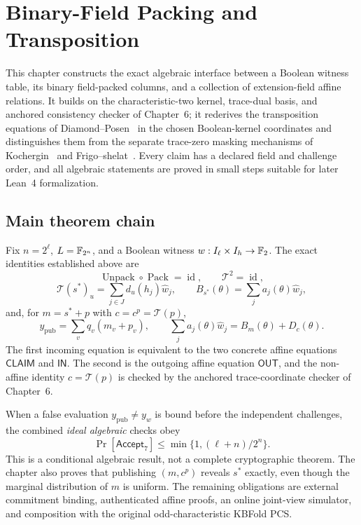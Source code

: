 \section{Binary-Field Packing and Transposition}\label{sec:packing}

This chapter constructs the exact algebraic interface
between a Boolean witness table, its binary field-packed
columns, and a collection of extension-field affine
relations. It builds on the characteristic-two kernel,
trace-dual basis, and anchored consistency checker of
Chapter~6; it rederives the transposition equations of
Diamond--Posen~\cite{DiamondPosen2024} in the chosen
Boolean-kernel coordinates and distinguishes them from
the separate trace-zero masking mechanisms of
Kochergin~\cite{Kochergin2026} and
Frigo--shelat~\cite{FrigoShelat2026}.
Every claim has a declared field and challenge order,
and all algebraic statements are proved in small steps
suitable for later Lean~4 formalization.









\subsection{Main theorem chain}\label{sec:packing:conclusion}

Fix $n=2^\ell$, $L=\mathbb{F}_{2^n}$, and a Boolean
witness $w:I_\ell\times I_h\to\mathbb{F}_2$.
The exact identities established above are
\[
 \boxed{
 \operatorname{Unpack}\circ\operatorname{Pack}
        =\operatorname{id},\qquad
 \mathcal T^2=\operatorname{id},}
\]
\[
 \boxed{
 \mathcal T(s^*)_u
 =\sum_{j\in J}d_u(h_j)\widehat w_j,\qquad
 B_{s^*}(\theta)=\sum_ja_j(\theta)\widehat w_j,}
\]
and, for $m=s^*+p$ with $c=c^p=\mathcal T(p)$,
\[
 \boxed{
 y_{\mathrm{pub}}=\sum_vq_v(m_v+p_v),\qquad
 \sum_ja_j(\theta)\widehat w_j
       =B_m(\theta)+D_c(\theta).}
\]
The first incoming equation is equivalent to
the two concrete affine equations
$\mathsf{CLAIM}$ and $\mathsf{IN}$.
The second is the outgoing affine equation
$\mathsf{OUT}$, and the non-affine identity
$c=\mathcal T(p)$ is checked by the
anchored trace-coordinate checker of Chapter~6.

When a false evaluation $y_{\mathrm{pub}}\neq y_w$
is bound before the independent challenges,
the combined \emph{ideal algebraic} checks obey
\[
 \boxed{
 \Pr[\mathsf{Accept}_7]\leq
 \min\{1,(\ell+n)/2^n\}.}
\]
This is a conditional algebraic result, not a
complete cryptographic theorem.
The chapter also proves that publishing
$(m,c^p)$ reveals $s^*$ exactly, even though
the marginal distribution of $m$ is uniform.
The remaining obligations are external
commitment binding, authenticated affine
proofs, an online joint-view simulator, and
composition with the original odd-characteristic
KBFold PCS.
